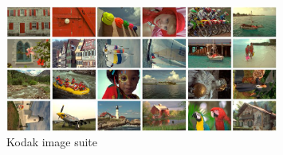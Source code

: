 \begin{figure}[H]
    \centering
    \includegraphics[width=0.8\textwidth]{figures/debayer/kodak_test_suite.png}
    \caption{Kodak image suite \cite{franzenTrueColorKodak2013}\cite{chungAdaptiveColorFilter2006}}
    \label{fig:kodak_image_suite}
\end{figure}


